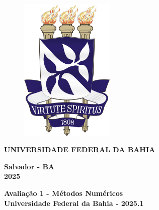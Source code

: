 \documentclass{article}
\begin{document}
\begin{titlepage}
\begin{figure}[h]
    \centering
    \includegraphics[width=0.4\textwidth]{brasao_ufba.jpg}
    \label{fig:logo}
\end{figure}

    \centering
    \textbf{\large UNIVERSIDADE FEDERAL DA BAHIA} \\
    
    \vspace{13cm}
    
    \textbf{\large Salvador - BA} \\
    \textbf{\large 2025}
    
    
    
\end{titlepage}




\begin{center}
\large\textbf{Avaliação 1 - Métodos Numéricos} \\
\large\textbf{ Universidade Federal da Bahia - 2025.1} \\
\end{center}
\end{document}

